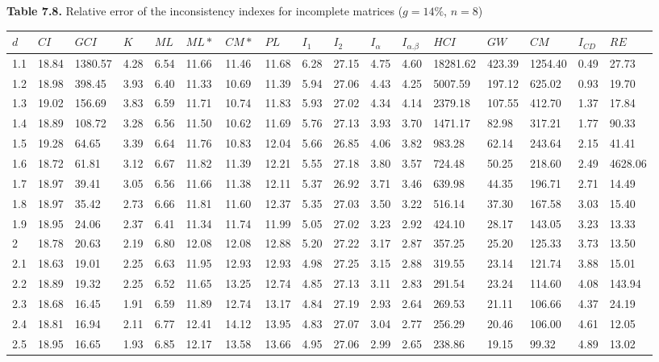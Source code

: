 \newpage
\textbf{Table 7.8.} Relative error of the inconsistency indexes for incomplete matrices ($g=14\%$, $n=8$)
\begin{adjustbox}{angle=90}
  \begin{center}
    \begin{tabular}{|l|llllllllllllllll|}
      \hline $d$ &
$CI$&$GCI$&$K$&$ML$&$ML*$&$CM*$&$PL$&$I_1$&$I_2$&$I_{\alpha}$&$I_{\alpha.\beta}$&$HCI$&$GW$&$CM$&$I_{CD}$&$RE$\\ \hline \hline
1.1&18.84&1380.57&4.28&6.54&11.66&11.46&11.68&6.28&27.15&4.75&4.60&18281.62&423.39&1254.40&0.49&27.73  \\ 
1.2&18.98&398.45&3.93&6.40&11.33&10.69&11.39&5.94&27.06&4.43&4.25&5007.59&197.12&625.02&0.93&19.70  \\ 
1.3&19.02&156.69&3.83&6.59&11.71&10.74&11.83&5.93&27.02&4.34&4.14&2379.18&107.55&412.70&1.37&17.84  \\ 
1.4&18.89&108.72&3.28&6.56&11.50&10.62&11.69&5.76&27.13&3.93&3.70&1471.17&82.98&317.21&1.77&90.33  \\ 
1.5&19.28&64.65&3.39&6.64&11.76&10.83&12.04&5.66&26.85&4.06&3.82&983.28&62.14&243.64&2.15&41.41  \\ 
1.6&18.72&61.81&3.12&6.67&11.82&11.39&12.21&5.55&27.18&3.80&3.57&724.48&50.25&218.60&2.49&4628.06  \\ 
1.7&18.97&39.41&3.05&6.56&11.66&11.38&12.11&5.37&26.92&3.71&3.46&639.98&44.35&196.71&2.71&14.49  \\ 
1.8&18.97&35.42&2.73&6.66&11.81&11.60&12.37&5.35&27.03&3.50&3.22&516.14&37.30&167.58&3.03&15.40  \\ 
1.9&18.95&24.06&2.37&6.41&11.34&11.74&11.99&5.05&27.02&3.23&2.92&424.10&28.17&143.05&3.23&13.33  \\ 
2&18.78&20.63&2.19&6.80&12.08&12.08&12.88&5.20&27.22&3.17&2.87&357.25&25.20&125.33&3.73&13.50  \\ 
2.1&18.63&19.01&2.25&6.63&11.95&12.93&12.93&4.98&27.25&3.15&2.88&319.55&23.14&121.74&3.88&15.01  \\ 
2.2&18.89&19.32&2.25&6.52&11.65&13.25&12.74&4.85&27.13&3.11&2.83&291.54&23.24&114.60&4.08&143.94  \\ 
2.3&18.68&16.45&1.91&6.59&11.89&12.74&13.17&4.84&27.19&2.93&2.64&269.53&21.11&106.66&4.37&24.19  \\ 
2.4&18.81&16.94&2.11&6.77&12.41&14.12&13.95&4.83&27.07&3.04&2.77&256.29&20.46&106.00&4.61&12.05  \\ 
2.5&18.95&16.65&1.93&6.85&12.17&13.58&13.66&4.95&27.06&2.99&2.65&238.86&19.15&99.32&4.89&13.02  \\ 

\end{tabular}
\end{center}
\end{adjustbox}
